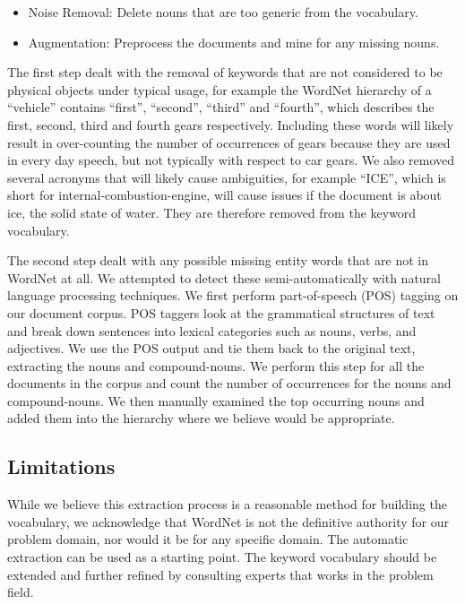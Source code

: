 \begin{itemize} [noitemsep]
  \item Noise Removal: Delete nouns that are too generic from the vocabulary.
  \item Augmentation: Preprocess the documents and mine for any missing nouns.
\end{itemize}
The first step dealt with the removal of keywords that are not considered to be
physical objects under typical usage, for example the WordNet hierarchy of a
``vehicle'' contains ``first'', ``second'', ``third'' and ``fourth'', which
describes the first, second, third and fourth gears respectively. Including
these words will likely result in over-counting the number of occurrences of
gears because they are used in every day speech, but not typically with respect
to car gears. We also removed several acronyms that will likely cause
ambiguities, for example ``ICE'', which is short for internal-combustion-engine,
will cause issues if the document is about ice, the solid state of water. They
are therefore removed from the keyword vocabulary.

The second step dealt with any possible missing entity words that are not in
WordNet at all. We attempted to detect these semi-automatically with natural
language processing techniques. We first perform part-of-speech (POS) tagging on our document 
corpus. POS taggers look at the grammatical structures of text and break down 
sentences into lexical categories such as nouns, verbs, and adjectives. We use the 
POS output and tie them back to the original text, extracting the nouns and 
compound-nouns. We perform this step for all the documents in the corpus and 
count the number of occurrences for the nouns and compound-nouns. We then manually 
examined the top occurring nouns and added them into the hierarchy where we believe 
would be appropriate.

\subsection{Limitations}
While we believe this extraction process is a reasonable method for building the
vocabulary, we acknowledge that WordNet is not the definitive authority for our 
problem domain, nor would it be for any specific domain. The automatic
extraction can be used as a starting point. The keyword vocabulary should be
extended and further refined by consulting experts that works in the problem field. 



